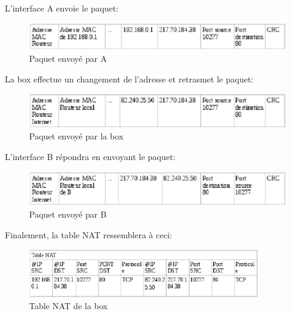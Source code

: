 L'interface A envoie le paquet:
\begin{figure}[h]
\centering
\includegraphics[width=12cm]{./pics/PaquetAR.eps}
\caption{Paquet envoyé par A}
\label{fig:paquetAR}
\end{figure}

La box effectue un changement de l'adresse et retrasmet le paquet:
\begin{figure}[h]
\centering
\includegraphics[width=12cm]{./pics/PaquetRB.eps}
\caption{Paquet envoyé par la box}
\label{fig:paquetRB}
\end{figure}

\newpage

L'interface B répondra en envoyant le paquet:
\begin{figure}[h]
\centering
\includegraphics[width=12cm]{./pics/PaquetBR.eps}
\caption{Paquet envoyé par B}
\label{fig:paquetBR}
\end{figure}
\smallbreak
Finalement, la table NAT ressemblera à ceci:

\begin{figure}[h]
\centering
\includegraphics[width=10cm]{./pics/TableNAT1.eps}
\caption{Table NAT de la box}
\label{fig:NAT1}
\end{figure}

